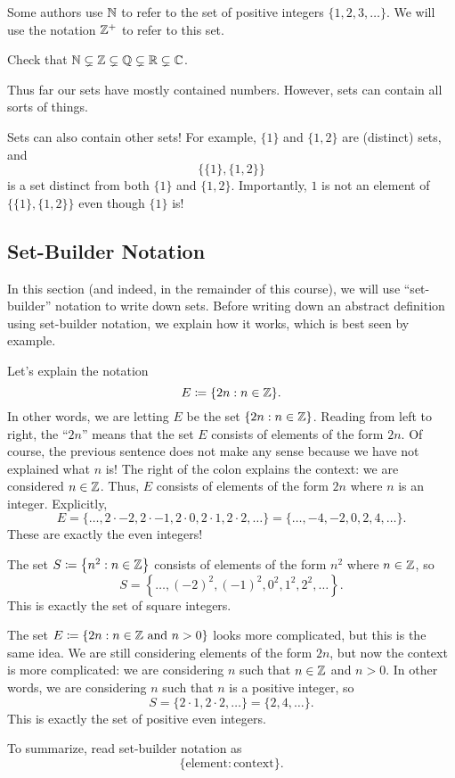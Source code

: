 \documentclass[../notes.tex]{subfiles}
\begin{document}
\begin{warn}
    Some authors use $\mathbb N$ to refer to the set of positive integers $\{1,2,3,\ldots\}$. We will use the notation $\mathbb Z^+$ to refer to this set.
\end{warn}
\begin{exercise}
    Check that $\mathbb N \subsetneq \mathbb Z \subsetneq \mathbb Q \subsetneq \mathbb R \subsetneq \mathbb C$.
\end{exercise}
Thus far our sets have mostly contained numbers. However, sets can contain all sorts of things.
\begin{example}
    Sets can also contain other sets! For example, $\{1\}$ and $\{1,2\}$ are (distinct) sets, and
    \[\{\{1\},\{1,2\}\}\]
    is a set distinct from both $\{1\}$ and $\{1,2\}$. Importantly, $1$ is not an element of $\{\{1\},\{1,2\}\}$ even though $\{1\}$ is!
\end{example}

\subsection{Set-Builder Notation}
In this section (and indeed, in the remainder of this course), we will use ``set-builder'' notation to write down sets. Before writing down an abstract definition using set-builder notation, we explain how it works, which is best seen by example.
\begin{example}
    Let's explain the notation
    \[E\coloneqq\{2n:n\in\mathbb Z\}.\]
    In other words, we are letting $E$ be the set $\{2n:n\in\mathbb Z\}$. Reading from left to right, the ``$2n$'' means that the set $E$ consists of elements of the form $2n$. Of course, the previous sentence does not make any sense because we have not explained what $n$ is! The right of the colon explains the context: we are considered $n\in\mathbb Z$. Thus, $E$ consists of elements of the form $2n$ where $n$ is an integer. Explicitly,
    \[E=\{\ldots,2\cdot-2,2\cdot-1,2\cdot0,2\cdot1,2\cdot2,\ldots\}=\{\ldots,-4,-2,0,2,4,\ldots\}.\]
    These are exactly the even integers!
\end{example}
\begin{example}
    The set $S\coloneqq\left\{n^2:n\in\mathbb Z\right\}$ consists of elements of the form $n^2$ where $n\in\mathbb Z$, so
    \[S=\left\{\ldots,(-2)^2,(-1)^2,0^2,1^2,2^2,\ldots\right\}.\]
    This is exactly the set of square integers. 
\end{example}
\begin{example}
    The set $E\coloneqq\{2n:n\in\mathbb Z\text{ and }n>0\}$ looks more complicated, but this is the same idea. We are still considering elements of the form $2n$, but now the context is more complicated: we are considering $n$ such that $n\in\mathbb Z$ and $n>0$. In other words, we are considering $n$ such that $n$ is a positive integer, so
    \[S=\{2\cdot1,2\cdot2,\ldots\}=\{2,4,\ldots\}.\]
    This is exactly the set of positive even integers.
\end{example}
To summarize, read set-builder notation as
\[\{\text{element}:\text{context}\}.\]
\end{document}

